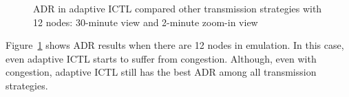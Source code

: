 \documentclass[12pt]{report}
\begin{document}
\begin{figure}[H]
  \caption{\label{fig:adaptive_adr_12}ADR in adaptive ICTL compared other transmission strategies with 12 nodes: 30-minute view and 2-minute zoom-in view}
\end{figure}

Figure~\ref{fig:adaptive_adr_12} shows ADR results when there are 12 nodes in emulation. In this case, even adaptive ICTL starts to suffer from congestion. Although, even with congestion, adaptive ICTL still has the best ADR among all transmission strategies.
\end{document}
